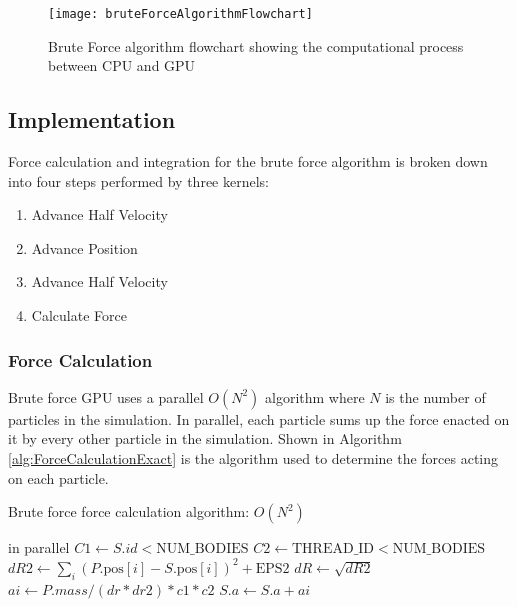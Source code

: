 \documentclass{thesis}
\begin{document}
\begin{figure}[h]
    \caption{Brute Force algorithm flowchart showing the computational process between CPU and GPU}
    \label{fig:GPUBruteForceAlg}
    \centering
    \texttt{[image: bruteForceAlgorithmFlowchart]}
\end{figure}

\subsection{Implementation}
Force calculation and integration for the brute force algorithm is broken down into four steps performed by three kernels:
\begin{enumerate}[noitemsep]
    \item Advance Half Velocity
    \item Advance Position
    \item Advance Half Velocity
    \item Calculate Force
\end{enumerate}
\subsubsection{Force Calculation}
Brute force GPU uses a parallel $O(N^2)$ algorithm where $N$ is the number of particles in the simulation. In parallel, each particle sums up the force enacted on it by every other particle in the simulation. Shown in Algorithm \ref{alg:ForceCalculationExact} is the algorithm used to determine the forces acting on each particle.
\begin{algorithm}
    \label{alg:ForceCalculationExact}
    \caption{Brute force force calculation algorithm: $O(N^2)$}
    \begin{algorithmic}
         in parallel
                \State $C1 \gets S.id < \text{NUM\_BODIES}$
                \State $C2 \gets \text{THREAD\_ID} < \text{NUM\_BODIES}$
                \State $dR2 \gets \sum_i (P.\text{pos}[i] - S.\text{pos}[i])^2 + \text{EPS2}$
                \State $dR \gets \sqrt{dR2}$
                \State $ai \gets P.mass/(dr*dr2) * c1 * c2$
                \State $S.a \gets S.a + ai$ 
            \EndFor
        \EndFor
    \end{algorithmic}
\end{algorithm}
\end{document}
